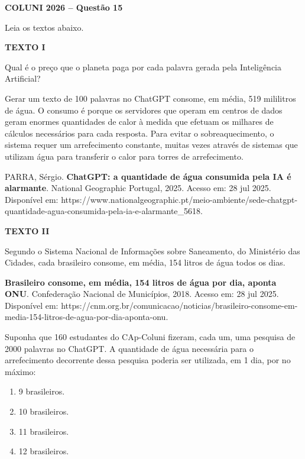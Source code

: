\textbf{COLUNI 2026 -- Questão 15}\par\medskip Leia os textos abaixo.

\textbf{TEXTO I}

Qual é o preço que o planeta paga por cada palavra gerada pela Inteligência Artificial?

Gerar um texto de 100 palavras no ChatGPT consome, em média, 519 mililitros de água. O consumo é porque os servidores que operam em centros de dados geram enormes quantidades de calor à medida que efetuam os milhares de cálculos necessários para cada resposta. Para evitar o sobreaquecimento, o sistema requer um arrefecimento constante, muitas vezes através de sistemas que utilizam água para transferir o calor para torres de arrefecimento.

\noindent PARRA, Sérgio. \textbf{ChatGPT: a quantidade de água consumida pela IA é alarmante}. National Geographic Portugal, 2025. Acesso em: 28 jul 2025. Disponível em: https://www.nationalgeographic.pt/meio-ambiente/sede-chatgpt-quantidade-agua-consumida-pela-ia-e-alarmante\_5618.

\textbf{TEXTO II}

Segundo o Sistema Nacional de Informações sobre Saneamento, do Ministério das Cidades, cada brasileiro consome, em média, 154 litros de água todos os dias.

\noindent \textbf{Brasileiro consome, em média, 154 litros de água por dia, aponta ONU}. Confederação Nacional de Municípios, 2018. Acesso em: 28 jul 2025. Disponível em: https://cnm.org.br/comunicacao/noticias/brasileiro-consome-em-media-154-litros-de-agua-por-dia-aponta-onu.

Suponha que 160 estudantes do CAp-Coluni fizeram, cada um, uma pesquisa de 2000 palavras no ChatGPT. A quantidade de água necessária para o arrefecimento decorrente dessa pesquisa poderia ser utilizada, em 1 dia, por no máximo:
\begin{enumerate}
\item 9 brasileiros.
\item 10 brasileiros.
\item 11 brasileiros.
\item 12 brasileiros.
\end{enumerate}
